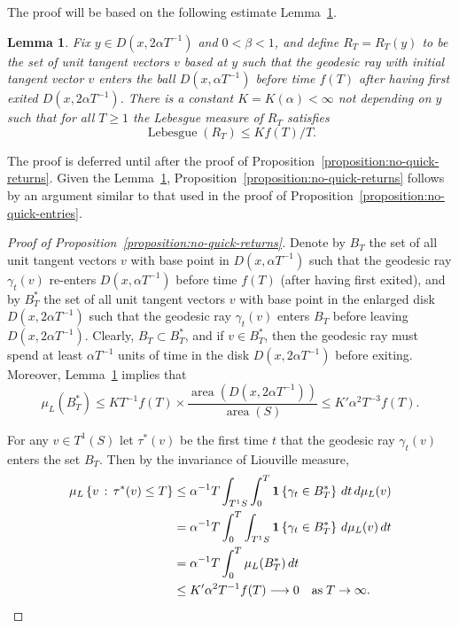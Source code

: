 \documentclass[10pt]{amsart}
\newtheorem{lemm}[theo]{Lemma}\newtheorem{prop}[theo]{Proposition}\newtheorem{coro}[theo]{Corollary}\newtheorem{conj}[theo]{Conjecture}
\theoremstyle{definition}\newtheorem{defi}[theo]{Definition}\newtheorem{rema}[theo]{Remark}\newtheorem{exam}[theo]{Example}\newtheorem{exem}[theo]{Example}\newtheorem{nota}[theo]{Notation}
\newcommand{\xset}[1]{\left\{ #1 \right\}}
\DeclareMathOperator{\area}{area}
\DeclareMathOperator{\Lebesgue}{Lebesgue}
\begin{document}
The proof will be based on the following estimate Lemma~\ref{lemma:no-quick-returns}.

\begin{lemm}\label{lemma:no-quick-returns}
Fix $y \in D(x, 2\alpha T^{-1})$ and $0< \beta <1$, and define $R_{T}=R_{T}(y)$ to be the set of unit tangent vectors $v$ based at $y$ such that the geodesic ray with initial tangent vector $v$ enters the ball $D(x, \alpha T^{-1})$ before time $f(T)$ after having first exited $D(x, 2 \alpha T^{-1})$. There is a constant $K=K(\alpha)< \infty$ not depending on $y$ such that for all $T \geq 1$ the Lebesgue measure of $R_{T}$ satisfies
\begin{equation}\label{eq:no-quick-returns}
\Lebesgue (R_{T})\leq K f(T)/T.
\end{equation}
\end{lemm}

The proof is deferred until after the proof of Proposition~\ref{proposition:no-quick-returns}. Given the Lemma~\ref{lemma:no-quick-returns}, Proposition~\ref{proposition:no-quick-returns} follows by an argument similar to that used in the proof of Proposition~\ref{proposition:no-quick-entries}.

\begin{proof}[Proof of Proposition~\ref{proposition:no-quick-returns}]
Denote by $B_{T}$ the set of all unit tangent vectors $v$ with base point in $D(x, \alpha T^{-1})$ such that the geodesic ray $\gamma_{t}(v)$ re-enters $D(x, \alpha T^{-1})$ before time $f(T)$ (after having first exited), and by $B^{*}_{T}$ the set of all unit tangent vectors $v$ with base point in the enlarged disk $D(x, 2\alpha T^{-1})$ such that the geodesic ray $\gamma_{t}(v)$ enters $B_{T}$ before leaving $D(x, 2\alpha T^{-1})$. Clearly, $B_{T}\subset B^{*}_{T}$, and if $v \in B^{*}_{T}$, then the geodesic ray must spend at least $\alpha T^{-1}$ units of time in the disk $D(x, 2 \alpha T^{-1})$ before exiting. Moreover, Lemma~\ref{lemma:no-quick-returns} implies that
\[
\mu_{L}(B^{*}_{T})\leq K T^{-1} f(T)\times \frac{\area(D(x, 2 \alpha T^{-1}))}{\area(S)} \leq K'
\alpha^{2} T^{-3} f(T).
\]

For any $v\in T^{1}(S)$ let $\tau^{*}(v)$ be the first time $t$ that the geodesic ray $\gamma_{t}(v)$ enters the set $B_{T}$. Then by the invariance of Liouville measure,
\begin{align*}
\mu_{L}\xset {v \,:\, \tau^{*}(v)\leq T} & \leq \alpha^{-1}T
\int_{T^{1}S}\int_{0}^{T} \mathbf{1}\xset {\gamma_{t}\in B^{*}_{T}} \, dt \,d\mu_{L}(v)\\
& = \alpha^{-1}T\int_{0}^{T} \int_{T^{1}S} \mathbf{1}
\xset {\gamma_{t}\in B^{*}_{T}} \, d\mu_{L}(v) \,dt\\
&= \alpha^{-1}T \int_{0}^{T}\mu_{L}(B^{*}_{T}) \, dt \\
&\leq K' \alpha^{2} T^{-1} f(T)\longrightarrow 0 \quad \text{as} \; T \rightarrow \infty.\qedhere
\end{align*}
\end{proof}
\end{document}
